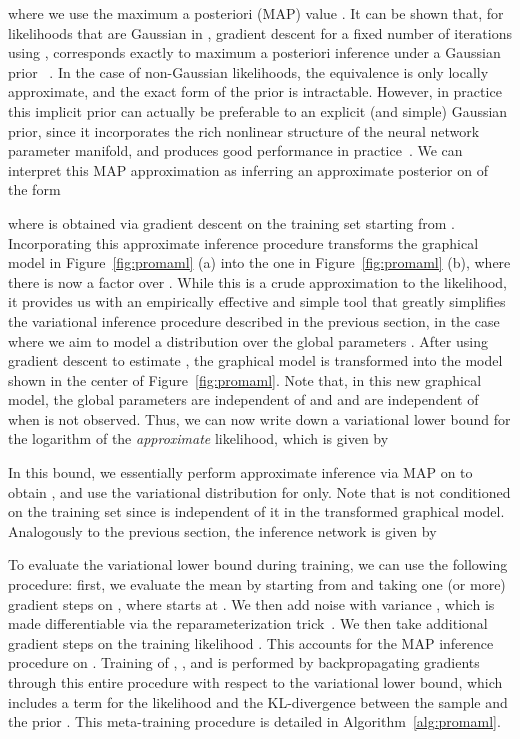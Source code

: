 \documentclass{article}
\begin{document}
where we use the maximum a posteriori (MAP) value . It can be shown that, for likelihoods that are Gaussian in , gradient descent for a fixed number of iterations using ,  corresponds exactly to maximum a posteriori inference under a Gaussian prior ~\cite{santos}. In the case of non-Gaussian likelihoods, the equivalence is only locally approximate, and the exact form of the prior  is intractable. However, in practice this implicit prior can actually be preferable to an explicit (and simple) Gaussian prior, since it incorporates the rich nonlinear structure of the neural network parameter manifold, and produces good performance in practice~\cite{finn2017model,grant2018recasting}.
We can interpret this MAP approximation as inferring an approximate posterior on  of the form

where  is obtained via gradient descent on the training set  starting from . Incorporating this approximate inference procedure transforms the graphical model in Figure~\ref{fig:promaml} (a) into the one in Figure~\ref{fig:promaml} (b), where there is now a factor over .
While this is a crude approximation to the likelihood, it provides us with an empirically effective and simple tool that greatly simplifies the variational inference procedure described in the previous section, in the case where we aim to model a distribution over the global parameters .
After using gradient descent to estimate , 
the graphical model is transformed into the model shown in the center of Figure~\ref{fig:promaml}.
Note that, in this new graphical model, the global parameters  are independent of  and  and are independent of  when  is not observed.
Thus, we can now write down a variational lower bound for the logarithm of the \emph{approximate} likelihood, which is given by

In this bound, we essentially perform approximate inference via MAP on  to obtain , and use the variational distribution for  only. 
Note that  is not conditioned on the training set  since  is independent of it in the transformed graphical model.
Analogously to the previous section, the inference network is given by

To evaluate the variational lower bound during training, we can use the following procedure: first, we evaluate the mean by starting from  and taking one (or more) gradient steps on , where  starts at . We then add noise with variance , which is made differentiable via the reparameterization trick~\cite{kingma2013auto}. We then take additional gradient steps on the training likelihood . This accounts for the MAP inference procedure on . Training of , , and  is performed by backpropagating gradients through this entire procedure with respect to the variational lower bound, which includes a term for the likelihood  and the KL-divergence between the sample  and the prior . This meta-training procedure is detailed in Algorithm~\ref{alg:promaml}.
\end{document}
